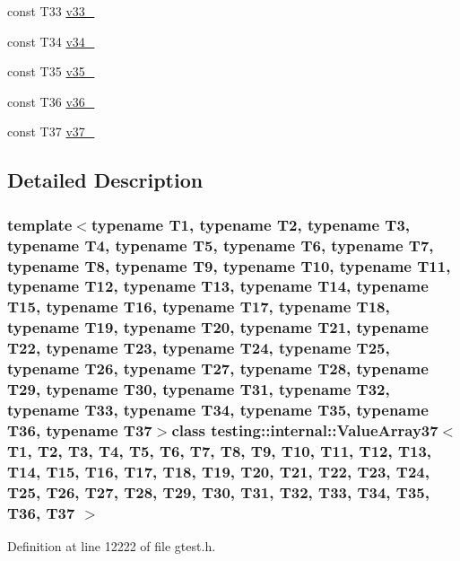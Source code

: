 \begin{DoxyCompactItemize}
\item 
const \-T33 \hyperlink{classtesting_1_1internal_1_1ValueArray37_a7a6cefe370b709c3a7b35b6d5ca8c778}{v33\-\_\-}
\item 
const \-T34 \hyperlink{classtesting_1_1internal_1_1ValueArray37_ab379e4d515d66bc57e05267515fab1d9}{v34\-\_\-}
\item 
const \-T35 \hyperlink{classtesting_1_1internal_1_1ValueArray37_a0a36112ac9b7a13572874977627ed192}{v35\-\_\-}
\item 
const \-T36 \hyperlink{classtesting_1_1internal_1_1ValueArray37_a531a52e3e8de6e982edd23c2547e4c49}{v36\-\_\-}
\item 
const \-T37 \hyperlink{classtesting_1_1internal_1_1ValueArray37_a2c4a91368c3edf933948acb4996a833d}{v37\-\_\-}
\end{DoxyCompactItemize}


\subsection{\-Detailed \-Description}
\subsubsection*{template$<$typename T1, typename T2, typename T3, typename T4, typename T5, typename T6, typename T7, typename T8, typename T9, typename T10, typename T11, typename T12, typename T13, typename T14, typename T15, typename T16, typename T17, typename T18, typename T19, typename T20, typename T21, typename T22, typename T23, typename T24, typename T25, typename T26, typename T27, typename T28, typename T29, typename T30, typename T31, typename T32, typename T33, typename T34, typename T35, typename T36, typename T37$>$class testing\-::internal\-::\-Value\-Array37$<$ T1, T2, T3, T4, T5, T6, T7, T8, T9, T10, T11, T12, T13, T14, T15, T16, T17, T18, T19, T20, T21, T22, T23, T24, T25, T26, T27, T28, T29, T30, T31, T32, T33, T34, T35, T36, T37 $>$}



\-Definition at line 12222 of file gtest.\-h.




